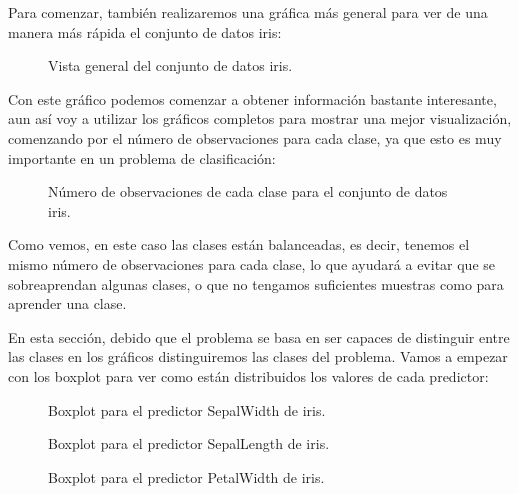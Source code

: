 Para comenzar, también realizaremos una gráfica más general para ver de una manera más rápida el conjunto de datos iris:

\begin{figure}[H]
	\centering
	
	\caption{Vista general del conjunto de datos iris.}
	\label{fig:vista_general_iris}
\end{figure}


Con este gráfico podemos comenzar a obtener información bastante interesante, aun así voy a utilizar los gráficos completos para mostrar una mejor visualización, comenzando por el número de observaciones para cada clase, ya que esto es muy importante en un problema de clasificación:

\begin{figure}[H]
	\centering
	
	\caption{Número de observaciones de cada clase para el conjunto de datos iris.}
	\label{fig:recuento_clases_iris}
\end{figure}

Como vemos, en este caso las clases están balanceadas, es decir, tenemos el mismo número de observaciones para cada clase, lo que ayudará a evitar que se sobreaprendan algunas clases, o que no tengamos suficientes muestras como para aprender una clase.

En esta sección, debido que el problema se basa en ser capaces de distinguir entre las clases en los gráficos distinguiremos las clases del problema. Vamos a empezar con los boxplot para ver como están distribuidos los valores de cada predictor:

\begin{figure}[H]
	\centering
	
	\caption{Boxplot para el predictor SepalWidth de iris.}
	\label{fig:boxplot_iris_SepalWidth}
\end{figure}


\begin{figure}[H]
	\centering
	
	\caption{Boxplot para el predictor SepalLength de iris.}
	\label{fig:boxplot_iris_SepalLength}
\end{figure}


\begin{figure}[H]
	\centering
	
	\caption{Boxplot para el predictor PetalWidth de iris.}
	\label{fig:boxplot_iris_PetalWidth}
\end{figure}


